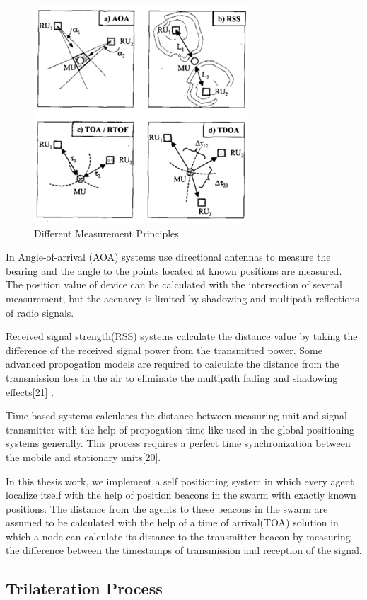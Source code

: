 \begin{figure}[H]
	\caption{Different Measurement Principles}
	\centering
	\includegraphics[scale = 1]{measurement}
\end{figure} 

In Angle-of-arrival (AOA) systems use directional antennas to measure the bearing and the angle to the points located at known positions are measured. The position value of device can be calculated with the intersection of several measurement, but the accuarcy is limited by shadowing and multipath reflections of radio signals. 

Received signal strength(RSS) systems calculate the distance value by taking the difference of the received signal power from the transmitted power. Some advanced propogation models are required to calculate the distance from the transmission loss in the air to eliminate the multipath fading and shadowing effects[21] . 

Time based systems calculates the distance between measuring unit and signal transmitter with the help of propogation time like used in the global positioning systems generally. This process requires a perfect time synchronization between the mobile and stationary units[20].

In this thesis work, we implement a self positioning system in which every agent localize itself with the help of position beacons in the swarm with exactly known positions. The distance from the agents to these beacons in the swarm are assumed to be calculated with the help of a time of arrival(TOA) solution in which a node can calculate its distance to the transmitter beacon by measuring the difference between the timestamps of transmission and reception of the signal. 


\subsection{Trilateration Process}


